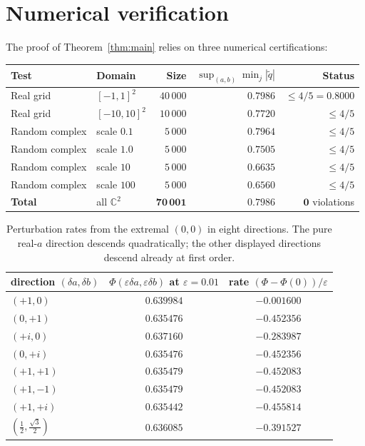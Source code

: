 \documentclass[11pt,a4paper]{article}
\begin{document}
\section{Numerical verification}\label{sec:numerics}

The proof of Theorem~\ref{thm:main} relies on three numerical certifications:

\begin{center}
\begin{tabular}{llrrr}
\toprule
\textbf{Test} & \textbf{Domain} & \textbf{Size} & $\sup_{(a,b)} \min_j |\tilde{q}|$ & Status \\
\midrule
Real grid & $[-1, 1]^2$       & $40\,000$ & $0.7986$ & $\le 4/5 = 0.8000$ \\
Real grid & $[-10, 10]^2$     & $10\,000$ & $0.7720$ & $\le 4/5$ \\
Random complex & scale $0.1$  & $5\,000$  & $0.7964$ & $\le 4/5$ \\
Random complex & scale $1.0$  & $5\,000$  & $0.7505$ & $\le 4/5$ \\
Random complex & scale $10$   & $5\,000$  & $0.6635$ & $\le 4/5$ \\
Random complex & scale $100$  & $5\,000$  & $0.6560$ & $\le 4/5$ \\
\midrule
\textbf{Total} & all $\mathbb{C}^2$ & $\mathbf{70\,001}$ & $0.7986$ & $\mathbf{0}$ violations \\
\bottomrule
\end{tabular}
\end{center}

\begin{table}[h]
\centering
\caption{Perturbation rates from the extremal $(0, 0)$ in eight directions. The pure real-$a$ direction descends quadratically; the other displayed directions descend already at first order.}
\label{tab:perturbations}
\begin{tabular}{lcc}
\toprule
direction $(\delta a, \delta b)$ & $\Phi(\varepsilon \delta a, \varepsilon \delta b)$ at $\varepsilon = 0.01$ & rate $(\Phi - \Phi(0))/\varepsilon$ \\
\midrule
$(+1, 0)$ & $0.639984$ & $-0.001600$ \\
$(0, +1)$ & $0.635476$ & $-0.452356$ \\
$(+i, 0)$ & $0.637160$ & $-0.283987$ \\
$(0, +i)$ & $0.635476$ & $-0.452356$ \\
$(+1, +1)$ & $0.635479$ & $-0.452083$ \\
$(+1, -1)$ & $0.635479$ & $-0.452083$ \\
$(+1, +i)$ & $0.635442$ & $-0.455814$ \\
$(\tfrac{1}{2}, \tfrac{\sqrt 3}{2})$ & $0.636085$ & $-0.391527$ \\
\bottomrule
\end{tabular}
\end{table}
\end{document}
